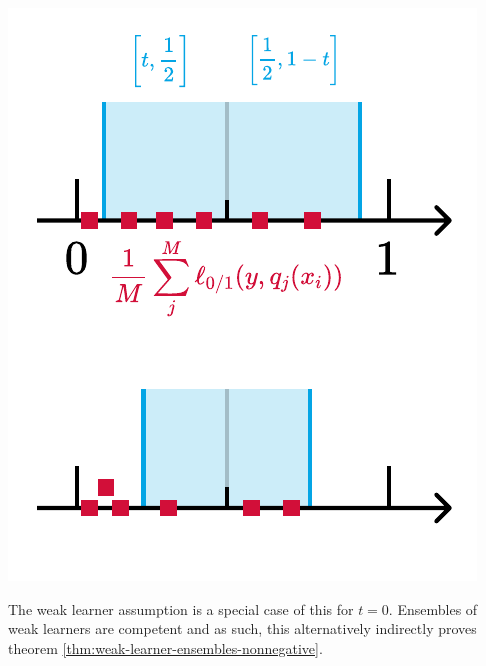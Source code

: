 \documentclass[../main.tex]{subfiles}
\begin{document}
\begin{marginfigure}
    \includegraphics[width=\textwidth]{figma-illustrations/competence.pdf}
    \label{fig:competence}
    \caption{
        Illustration for the competence condition \ref{def:competence}. Red squares correspond to pairs $(X,Y)$ from the joint distribution of examples and outcomes. For each of these pairs, the average/expected member error $W_{\Theta}(X,Y) \approx \Mavg \Lzo(y, q_i)$ is the ratio of incorrect members. The center $\frac{1}{2}$ is the majority vote threshold. Informally, an ensemble is competent, if, for any two intervals defined by $t$ left and right of the threshold, more examples are in the left part. For the upper example, this holds. For the lower example, even though many examples are classified correctly by many members, the ensemble is \textit{not} competent.
    }
\end{marginfigure}
The weak learner assumption is a special case of this for $t = 0$.  %
Ensembles of weak learners are competent and as such, this alternatively indirectly proves theorem \ref{thm:weak-learner-ensembles-nonnegative}.
\end{document}
